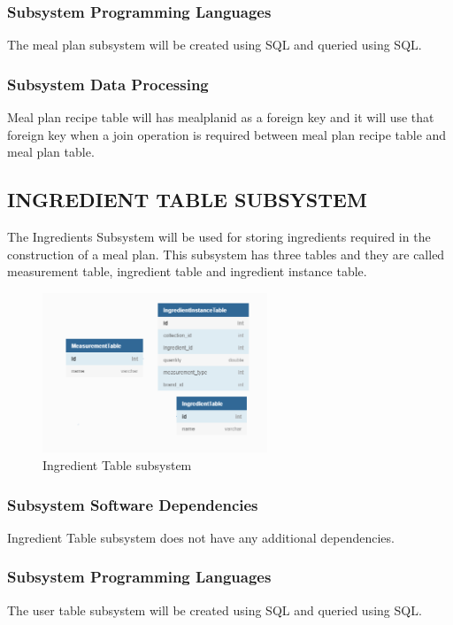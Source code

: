 \subsubsection{Subsystem Programming Languages}
The meal plan subsystem will be created using SQL and queried using SQL.

\subsubsection{Subsystem Data Processing}
Meal plan recipe table will has mealplanid as a foreign key and it will use that foreign key when a join operation is required between meal plan recipe table and meal plan table.

\subsection{INGREDIENT TABLE SUBSYSTEM }
The Ingredients Subsystem will be used for storing ingredients required in the construction of a meal plan. This subsystem has three tables and they are called measurement table, ingredient table and ingredient instance table.

\begin{figure}[h!]
	\centering
 	\includegraphics[width=0.60\textwidth]{images/Ingredient_SubSystempng.png}
 \caption{Ingredient Table subsystem}
\end{figure}

\subsubsection{Subsystem Software Dependencies}
Ingredient Table subsystem does not have any additional dependencies.

\subsubsection{Subsystem Programming Languages}
The user table subsystem will be created using SQL and queried using SQL.

